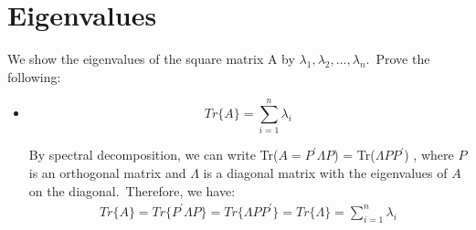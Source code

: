 \documentclass[12pt]{article}
\begin{document}
\section{Eigenvalues}
We show the eigenvalues of the square matrix A by $\lambda_1, \lambda_2, \ldots, \lambda_n$.\, Prove the following:
\begin{itemize}
    \item \begin{equation*}
              Tr\{A\} = \sum_{i=1}^n \lambda_i
          \end{equation*}
          \begin{qsolve}
              By spectral decomposition, we can write Tr($A = P^{\prime} \Lambda P$) = Tr($\Lambda P P^{\prime}$) , where $P$ is an orthogonal matrix and $\Lambda$ is a diagonal matrix with the eigenvalues of $A$ on the diagonal.\, Therefore, we have:
              \begin{align*}
                  Tr\{A\} = Tr\{P^{\prime} \Lambda P\} = Tr\{\Lambda P P^{\prime}\} = Tr\{\Lambda\} = \sum_{i=1}^n \lambda_i
              \end{align*}


\end{qsolve}
\end{itemize}
\end{document}
